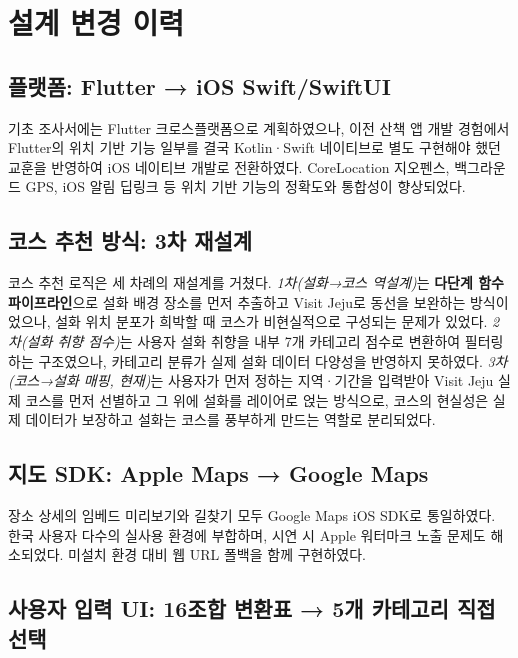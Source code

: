 \documentclass[10pt,twocolumn,a4paper]{article}
\begin{document}
\section{설계 변경 이력}

\subsection{플랫폼: Flutter → iOS Swift/SwiftUI}

기초 조사서에는 Flutter 크로스플랫폼으로 계획하였으나, 이전 산책 앱 개발
경험에서 Flutter의 위치 기반 기능 일부를 결국 Kotlin·Swift 네이티브로
별도 구현해야 했던 교훈을 반영하여 iOS 네이티브 개발로 전환하였다.
CoreLocation 지오펜스, 백그라운드 GPS, iOS 알림 딥링크 등 위치 기반 기능의
정확도와 통합성이 향상되었다.

\subsection{코스 추천 방식: 3차 재설계}

코스 추천 로직은 세 차례의 재설계를 거쳤다. \emph{1차(설화→코스 역설계)}는
\textbf{다단계 함수 파이프라인}으로 설화 배경 장소를 먼저 추출하고 Visit Jeju로
동선을 보완하는 방식이었으나, 설화 위치 분포가 희박할 때 코스가 비현실적으로
구성되는 문제가 있었다. \emph{2차(설화 취향 점수)}는 사용자 설화 취향을
내부 7개 카테고리 점수로 변환하여 필터링하는 구조였으나, 카테고리 분류가
실제 설화 데이터 다양성을 반영하지 못하였다. \emph{3차(코스→설화 매핑,
현재)}는 사용자가 먼저 정하는 지역·기간을 입력받아 Visit Jeju 실제 코스를
먼저 선별하고 그 위에 설화를 레이어로 얹는 방식으로, 코스의 현실성은 실제
데이터가 보장하고 설화는 코스를 풍부하게 만드는 역할로 분리되었다.

\subsection{지도 SDK: Apple Maps → Google Maps}

장소 상세의 임베드 미리보기와 길찾기 모두 Google Maps iOS SDK로 통일하였다.
한국 사용자 다수의 실사용 환경에 부합하며, 시연 시 Apple 워터마크 노출
문제도 해소되었다. 미설치 환경 대비 웹 URL 폴백을 함께 구현하였다.

\subsection{사용자 입력 UI: 16조합 변환표 → 5개 카테고리 직접 선택}
\end{document}
